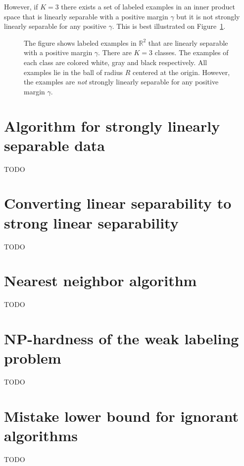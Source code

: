\documentclass[12pt]{article}
\newcommand{\R}{\mathbb{R}}  %
\begin{document}
However, if $K=3$ there exists a set of labeled examples in an inner product
space that is linearly separable with a positive margin $\gamma$ but it is not
strongly linearly separable for any positive $\gamma$. This is best illustrated
on Figure~\ref{figure:linearly-separable-examples-with-margin}.

\begin{figure}
\begin{center}

\end{center}
\caption{The figure shows labeled examples in $\R^2$ that are linearly separable with a
positive margin $\gamma$. There are $K=3$ classes. The examples of each class
are colored white, gray and black respectively. All examples lie in the ball of
radius $R$ centered at the origin. However, the examples are \emph{not} strongly
linearly separable for any positive margin $\gamma$.
}
\label{figure:linearly-separable-examples-with-margin}
\end{figure}

\section{Algorithm for strongly linearly separable data}
\label{section:algorithm-for-strongly-linearly-separable-data}

TODO


\section{Converting linear separability to strong linear separability}

TODO


\section{Nearest neighbor algorithm}

TODO


\section{NP-hardness of the weak labeling problem}

TODO


\section{Mistake lower bound for ignorant algorithms}

TODO





\end{document}
